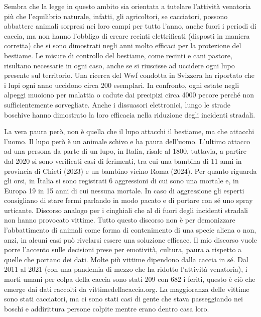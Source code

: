 \documentclass[12pt]{book} %
\begin{document}
\begin{mdframed}[linewidth=1pt]
Sembra che la legge in questo ambito sia orientata a tutelare l'attività venatoria più che
l'equilibrio naturale, infatti, gli agricoltori, se cacciatori, possono abbattere animali sorpresi
nei loro campi per tutto l'anno, anche fuori i periodi di caccia, ma non hanno
l'obbligo di creare recinti elettrificati (disposti in maniera corretta) che si sono dimostrati
negli anni molto efficaci per la protezione del bestiame. Le misure di controllo del bestiame, come recinti e cani
pastore, risultano necessarie in ogni caso, anche se si riuscisse ad uccidere ogni lupo presente sul territorio. Una
ricerca del Wwf condotta in Svizzera ha riportato che i lupi ogni anno uccidono circa 200 esemplari. In confronto, ogni
estate negli alpeggi muoiono per malattia o cadute dai precipizi circa 4000 pecore perché non sufficientemente
sorvegliate. Anche i dissuasori elettronici, lungo le strade boschive hanno dimostrato la loro efficacia nella
riduzione degli incidenti stradali.

La vera paura però, non è quella che il lupo attacchi il bestiame, ma che attacchi l'uomo. Il lupo
però è un animale schivo e ha paura dell'uomo. L'ultimo attacco ad una persona da parte di un lupo, in Italia, risale al 1800, tuttavia, a partire dal 2020 si sono verificati casi di ferimenti, tra cui una bambina di 11 anni in provincia di Chieti (2023) e un bambino vicino Roma (2024).
Per quanto riguarda gli orsi, in Italia si sono registrati 6 aggressioni di cui sono una mortale e, in Europa 19 in 15 anni di cui nessuna mortale. In caso di aggressione gli esperti consigliano di stare fermi parlando in modo pacato e di portare con sé uno spray urticante. Discorso analogo per i cinghiali che al di fuori degli incidenti stradali non hanno provocato vittime.
Tutto questo discorso non è per demonizzare l'abbattimento di animali come forma di contenimento di una specie aliena o non, anzi, in alcuni casi può rivelarsi essere una soluzione efficace. Il mio discorso vuole porre l'accento sulle decisioni prese per emotività, cultura, paura a rispetto a quelle che portano dei dati.
Molte più vittime dipendono dalla caccia in sé. Dal 2011 al 2021
(con una pandemia di mezzo che ha ridotto l'attività venatoria), i morti umani per colpa della
caccia sono stati 209 con 682 i feriti, questo è ciò che emerge dai dati raccolti da vittimedellacaccia.org. La
maggioranza delle vittime sono stati cacciatori, ma ci sono stati casi di gente che stava passeggiando nei boschi e
addirittura persone colpite mentre erano dentro casa loro. 
\end{mdframed}
\end{document}
